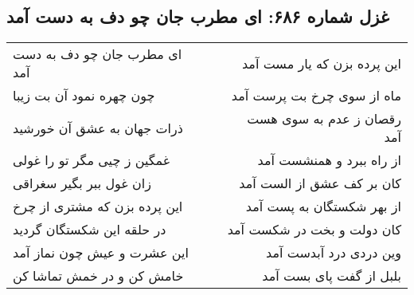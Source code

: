 \begin{center}
\section*{غزل شماره ۶۸۶: ای مطرب جان چو دف به دست آمد}
\label{sec:0686}
\begin{longtable}{l p{0.5cm} r}
ای مطرب جان چو دف به دست آمد
&&
این پرده بزن که یار مست آمد
\\
چون چهره نمود آن بت زیبا
&&
ماه از سوی چرخ بت پرست آمد
\\
ذرات جهان به عشق آن خورشید
&&
رقصان ز عدم به سوی هست آمد
\\
غمگین ز چیی مگر تو را غولی
&&
از راه ببرد و همنشست آمد
\\
زان غول ببر بگیر سغراقی
&&
کان بر کف عشق از الست آمد
\\
این پرده بزن که مشتری از چرخ
&&
از بهر شکستگان به پست آمد
\\
در حلقه این شکستگان گردید
&&
کان دولت و بخت در شکست آمد
\\
این عشرت و عیش چون نماز آمد
&&
وین دردی درد آبدست آمد
\\
خامش کن و در خمش تماشا کن
&&
بلبل از گفت پای بست آمد
\\
\end{longtable}
\end{center}
